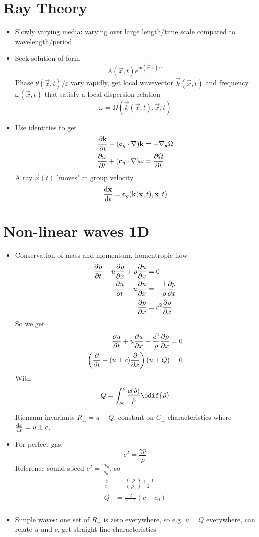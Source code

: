 \section{Ray Theory}
\begin{itemize}
    \item Slowly varying media: varying over large length/time scale compared to wavelength/period
    \item Seek solution of form \[A(\vec{x},t) e^{i\theta(\vec{x},t)/\varepsilon} \] 
    Phase $\theta(\vec{x},t)/\varepsilon$ vary rapidly, get local wavevector $\vec{k}(\vec{x},t)$ and frequency $\omega(\vec{x},t)$ that satisfy a local dispersion relation \[\omega = \Omega(\vec{k}(\vec{x},t),\vec{x},t)\] 
    \item Use identities to get 
    \begin{align*}
        \frac{\partial{\boldsymbol{\mathbf{k}}}}{\partial{t}}+(\boldsymbol{\mathbf{c}}_g\cdot\nabla)\boldsymbol{\mathbf{k}} &=-\nabla_{\boldsymbol{\mathbf{x}}}{\Omega}  \\
        \frac{\partial{\omega}}{\partial{t}}+(\boldsymbol{\mathbf{c}}_g\cdot\nabla)\omega &=\frac{\partial{\Omega}}{\partial{t}}    
    \end{align*}
    A ray $\vec{x}(t)$ 'moves' at group velocity \[\frac{\mathrm{d}{\boldsymbol{\mathbf{x}}}}{\mathrm{d}{t}} = \boldsymbol{\mathbf{c}}_g(\boldsymbol{\mathbf{k}}(\boldsymbol{\mathbf{x}},t),\boldsymbol{\mathbf{x}},t)\]
\end{itemize}
\section{Non-linear waves 1D}
\begin{itemize}
    \item Conservation of mass and momentum, homentropic flow
    \begin{align*}
        \frac{\partial{\rho}}{\partial{t}} + u \frac{\partial{\rho}}{\partial{x}} + \rho \frac{\partial{u}}{\partial{x}} &= 0 \\
        \frac{\partial{u}}{\partial{t}} + u \frac{\partial{u}}{\partial{x}} &= - \frac{1}{\rho} \frac{\partial{p}}{\partial{x}} \\
        \frac{\partial{p}}{\partial{x}} &= c^2 \frac{\partial{\rho}}{\partial{x}} 
    \end{align*}
    So we get
    \begin{align*}
        \frac{\partial{u}}{\partial{t}} + u \frac{\partial{u}}{\partial{x}} +\frac{c^2}{\rho} \frac{\partial{\rho}}{\partial{x}}   &= 0 \\
        \left(\frac{\partial{}}{\partial{t}} + (u\pm c) \frac{\partial{}}{\partial{x}} \right) (u\pm Q) &= 0
    \end{align*}
    With \[Q = \int_{\rho_0}^\rho \frac{c(\hat{\rho})}{\hat{\rho}} \odif{\hat{\rho}}\]

    Riemann invariants $R_\pm = u \pm Q$, constant on $C_\pm$ characteristics where $\frac{\mathrm{d}{x}}{\mathrm{d}{t}} = u\pm c$.

    \item For perfect gas:
    \[c^2 = \frac{\gamma p}{\rho} \]
    Reference sound speed $c^2 = \frac{\gamma p_0}{\rho_0} $, so 
    \begin{align*}
        \frac{c}{c_0} &= \left(\frac{\rho}{\rho_0}\right)\frac{\gamma-1}{2} \\
        Q &= \frac{2}{\gamma-1}(c-c_0) \\
    \end{align*}
    \item Simple waves: one set of $R_\pm$ is zero everywhere, so e.g. $u=Q$ everywhere, can relate $u$ and $c$, get straight line characteristics
\end{itemize}
